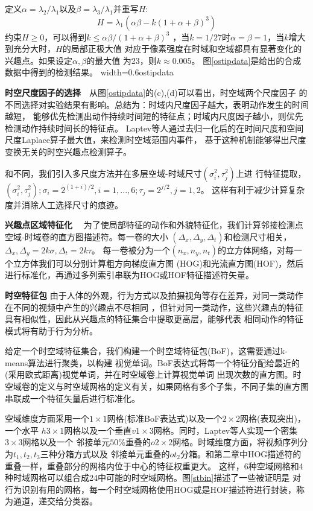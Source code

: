 定义$\alpha=\lambda_2/\lambda_1$以及$\beta=\lambda_3/\lambda_1$并重写$H$:
\begin{equation}
    H=\lambda_1(\alpha\beta-k(1+\alpha+\beta)^3)
\end{equation}
约束$H\geq0$，可以得到$k\leq\alpha\beta/(1+\alpha+\beta)^3$
，当$k=1/27$时$\alpha=\beta=1$，当$k$增大到充分大时，$H$的局部正极大值
对应于像素强度在时域和空域都具有显著变化的兴趣点。如果设定$\alpha,\beta$的最大值
为23，则$k\approx0.005$。
图\ref{ostipdata}是\cite{ostip}给出的合成数据中得到的检测结果。
{width=0.6\textwidth}{ostipdata}

\textbf{时空尺度因子的选择}~~从图\ref{ostipdata}的(c),(d)可以看出，时空域两个尺度因子
的不同选择对实验结果有影响。\cite{ostip}总结为：时域内尺度因子越大，表明动作发生的时间越短，
能够优先检测出动作持续时间短的特征点；时域内尺度因子越小，则优先检测动作持续时间长的特征点。
Laptev等人通过去归一化后的在时间尺度和空间尺度Laplace算子最大值，来检测时空域范围内事件，
基于这种机制能够得出尺度变换无关的时空兴趣点检测算子。

和\cite{ostip}不同，我们引入多尺度方法并在多层空域-时域尺寸$(\sigma_i^2,\tau_j^2)$上进
行特征提取，$(\sigma_i^2,\tau_j^2);\sigma_i=2^{(1+i)/2},i=1,...,6;\tau_j=2^{j/2},j=1,2$。
这样有利于减少计算复杂度并消除人工选择尺寸的痕迹。

\textbf{兴趣点区域特征化}~~
为了使局部特征的动作和外貌特征化，我们计算邻接检测点空域-时域卷的直方图描述符。每一卷的大小
$(\Delta_x,\Delta_y,\Delta_t)$和检测尺寸相关，$\Delta_x,\Delta_y=2k\sigma,\Delta_t=2k\tau$。
每一卷被分为一个$(n_x,n_y,n_t)$的立方体网络，对每一个立方体我们可以分别计算粗方向梯度直方图
(HOG)和光流直方图(HOF)，然后进行标准化，再通过多列索引串联为HOG或HOF特征描述符矢量。

\textbf{时空特征包}
由于人体的外观，行为方式以及拍摄视角等存在差异，对同一类动作在不同的视频中产生的兴趣点不尽相同
，但针对同一类动作，这些兴趣点的特征具有相似性，因此从兴趣点的特征集合中提取更高层，能够代表
相同动作的特征模式将有助于行为分析。

给定一个时空域特征集合，我们构建一个时空域特征包(BoF)，这需要通过k-means算法进行聚类，以构建
视觉单词。BoF表达式将每一个特征分配给最近的(采用欧式距离)视觉单词，并在时空域卷上计算视觉单词
出现次数的直方图。时空域卷的定义与时空域网格的定义有关，如果网格有多个子集，不同子集的直方图
串联成一个特征矢量后进行标准化。

空域维度方面\cite{stip}采用一个$1\times1$网格(标准BoF表达式)以及一个$2\times2$网格(表现突出)，一个水平
$h3\times1$网格以及一个垂直$v1\times3$网格。同时，Laptev等人实现一个密集$3\times3$网格以及一个
邻接单元$50\%$重叠的$o2\times2$网格。时域维度方面，将视频序列分为$t_1,t_2,t_3$三种分箱方式以及
邻接单元重叠的$ot_2$分箱。和第二章中HOG描述符的重叠一样，重叠部分的网格内位于中心的特征权重更大。
这样，6种空域网格和4种时域网格可以组合成24中可能的时空域网格。图\ref{stbin}描述了一些被证明是
对行为识别有用的网格，每一个时空域网格使用HOG或是HOF描述符进行封装，称为通道，递交给分类器。
